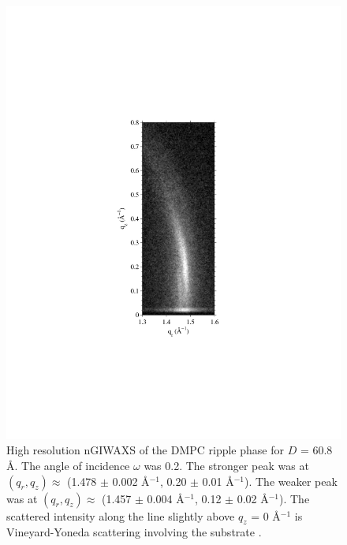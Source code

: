\begin{figure}[htbp]
  \centering
  \includegraphics[trim=100 170 100 170,clip,width=\textwidth]{figures/ripple/nGIWAXS/dmpc1_enlarge}
  \caption[High resolution nGIWAXS of the DMPC ripple phase for $D$ = 60.8 \AA]
  {High resolution nGIWAXS of the DMPC ripple phase for $D$ = 60.8 \AA.
  The angle of incidence $\omega$ was 0.2\textdegree. The stronger peak was at
  $(q_r, q_z) \approx$ (1.478 $\pm$ 0.002 \AA$^{-1}$, 0.20 $\pm$ 0.01 \AA$^{-1}$). 
  The weaker peak was at 
  $(q_r, q_z) \approx$ (1.457 $\pm$ 0.004 \AA$^{-1}$, 0.12 $\pm$ 0.02 \AA$^{-1}$). The scattered
  intensity along the line slightly above $q_z$ = 0 \AA$^{-1}$ is Vineyard-Yoneda
  scattering involving the substrate \cite{ref:Vineyard82,ref:Miller08}.}
  \label{fig:nGIWAXS_enlarge}
\end{figure}


